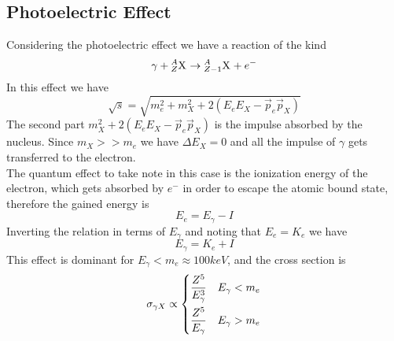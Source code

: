 \documentclass[../qm.tex]{subfiles}
\begin{document}
\subsection{Photoelectric Effect}
Considering the photoelectric effect we have a reaction of the kind
\begin{equation*}
	\gamma+\nuc{X}{A}{Z}\to\nuc{X}{A}{Z-1}+e^-
\end{equation*}
In this effect we have
\begin{equation*}
	\sqrt{s}=\sqrt{m_e^2+m_X^2+2\left( E_eE_X-\vec{p}_e\vec{p}_X \right)}
\end{equation*}
The second part $m_X^2+2\left( E_eE_X-\vec{p}_e\vec{p}_X \right)$ is the impulse absorbed by the nucleus. Since $m_X>>m_e$ we have $\Delta E_X=0$ and all the impulse of $\gamma$ gets transferred to the electron.\\
The quantum effect to take note in this case is the ionization energy of the electron, which gets absorbed by $e^-$ in order to escape the atomic bound state, therefore the gained energy is
\begin{equation*}
	E_e=E_\gamma-I
\end{equation*}
Inverting the relation in terms of $E_\gamma$ and noting that $E_e=K_e$ we have
\begin{equation*}
	E_\gamma=K_e+I
\end{equation*}
This effect is dominant for $E_\gamma<m_e\approx100\unit{keV}$, and the cross section is
\begin{equation}
	\sigma_{\gamma X}\propto\begin{dcases}
		\frac{Z^5}{E_\gamma^3}&E_\gamma<m_e\\
		\frac{Z^5}{E_\gamma}&E_\gamma>m_e
	\end{dcases}
	\label{eq:photoelectriccs}
\end{equation}
\end{document}
